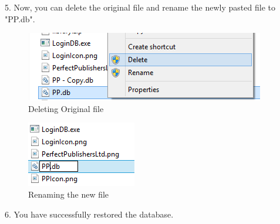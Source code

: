 5. Now, you can delete the original file and rename the newly pasted file to "PP.db".

\begin{figure}[H]
    \includegraphics[width=\textwidth]{./Manual/DeleteOriginal.png}
    \caption{Deleting Original file}
\end{figure}

\begin{figure}[H]
    \includegraphics[width=\textwidth]{./Manual/Rename.png}
    \caption{Renaming the new file}
\end{figure}

6. You have successfully restored the database.

\stopcontents[chapters]